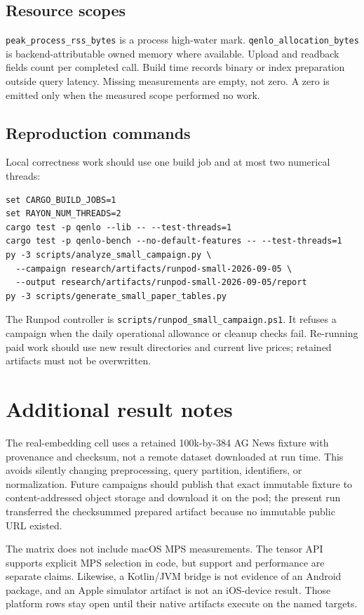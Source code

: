\subsection{Resource scopes}
\texttt{peak\_process\_rss\_bytes} is a process high-water mark. \texttt{qenlo\_allocation\_bytes} is backend-attributable owned memory where available. Upload and readback fields count per completed call. Build time records binary or index preparation outside query latency. Missing measurements are empty, not zero. A zero is emitted only when the measured scope performed no work.

\subsection{Reproduction commands}
Local correctness work should use one build job and at most two numerical threads:
\begin{verbatim}
set CARGO_BUILD_JOBS=1
set RAYON_NUM_THREADS=2
cargo test -p qenlo --lib -- --test-threads=1
cargo test -p qenlo-bench --no-default-features -- --test-threads=1
py -3 scripts/analyze_small_campaign.py \
  --campaign research/artifacts/runpod-small-2026-09-05 \
  --output research/artifacts/runpod-small-2026-09-05/report
py -3 scripts/generate_small_paper_tables.py
\end{verbatim}

The Runpod controller is \texttt{scripts/runpod\_small\_campaign.ps1}. It refuses a campaign when the daily operational allowance or cleanup checks fail. Re-running paid work should use new result directories and current live prices; retained artifacts must not be overwritten.

\section{Additional result notes}
The real-embedding cell uses a retained 100k-by-384 AG News fixture with provenance and checksum, not a remote dataset downloaded at run time. This avoids silently changing preprocessing, query partition, identifiers, or normalization. Future campaigns should publish that exact immutable fixture to content-addressed object storage and download it on the pod; the present run transferred the checksummed prepared artifact because no immutable public URL existed.

The matrix does not include macOS MPS measurements. The tensor API supports explicit MPS selection in code, but support and performance are separate claims. Likewise, a Kotlin/JVM bridge is not evidence of an Android package, and an Apple simulator artifact is not an iOS-device result. Those platform rows stay open until their native artifacts execute on the named targets.
